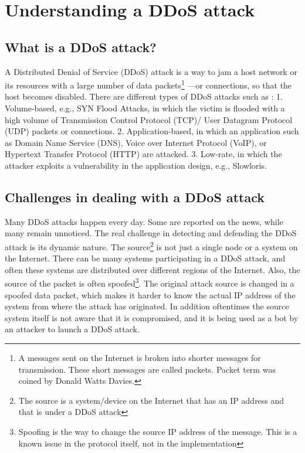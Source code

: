 \documentclass[12pt,oneside,a4paper]{article}
\begin{document}

\doublespacing
\renewcommand{\thepage}{\roman{page}}%
\setcounter{page}{2}%

\tableofcontents
\newpage
\pagestyle{myheadings}

\pagebreak
\renewcommand{\thepage}{\arabic{page}}%

\section{Understanding a DDoS attack}

\subsection{What is a DDoS attack?}
A Distributed Denial of Service (DDoS) attack is a way to jam a host network or its resources with a large number of data packets\footnote{A messages sent on the Internet is broken into shorter messages for transmission. These short messages are called packets. Packet term was coined by Donald Watts Davies.} \cite{network-data-packet} ---or connections, so that the host becomes disabled. There are different types of DDoS attacks such as :
1. Volume-based, e.g., SYN Flood Attacks, in which the victim is flooded with a high volume of  Transmission Control Protocol (TCP)/ User Datagram Protocol (UDP) packets or connections.
2. Application-based, in which an application such as Domain Name Service (DNS), Voice over Internet Protocol (VoIP), or Hypertext Transfer Protocol (HTTP) are attacked.
3. Low-rate, in which the attacker exploits a vulnerability in the application design, e.g., Slowloris.
\cite{DDoS-attacks}

\subsection{Challenges in dealing with a DDoS attack}
Many DDoS attacks happen every day\cite{ddos-attack-news}. Some are reported on the news, while many remain unnoticed. The real challenge in detecting and defending the DDoS attack is its dynamic nature. The source\footnote{The source is a system/device on the Internet that has an IP address and that is under a DDoS attack} is not just a single node or a system on the Internet. There can be many systems participating in a DDoS attack, and often these systems are distributed over different regions of the Internet. Also, the source of the packet is often spoofed\footnote{Spoofing is the way to change the source IP address of the message. This is a known issue in the protocol itself, not in the implementation}\cite{ip-spoofing}. The original attack source is changed in a spoofed data packet, which makes it harder to know the actual IP address of the system from where the attack has originated. In addition oftentimes the source system itself is not aware that it is compromised, and it is being used as a bot\cite{bot} by an attacker to launch a DDoS attack.
\end{document}
